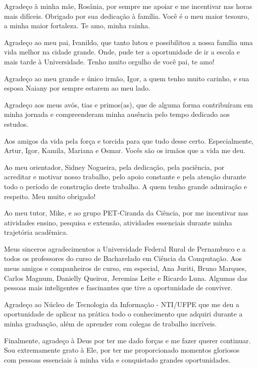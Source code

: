 \begin{agradecimentos}
Agradeço à minha mãe, Rosânia, por sempre me apoiar e me incentivar nas horas mais difíceis. Obrigado por sua dedicação à família. Você é o meu maior tesouro, a minha maior fortaleza. Te amo, minha rainha.

Agradeço ao meu pai, Ivanildo, que tanto lutou e possibilitou a nossa família uma vida melhor na cidade grande. Onde, pude ter a oportunidade de ir a escola e mais tarde à Universidade. Tenho muito orgulho de você pai, te amo!

Agradeço ao meu grande e único irmão, Igor, a quem tenho muito carinho, e sua esposa Naiany por sempre estarem ao meu lado.

Agradeço aos meus avós, tias e primos(as), que de alguma forma contribuíram em minha jornada e compreenderam minha ausência pelo tempo dedicado aos estudos.

Aos amigos da vida pela força e torcida para que tudo desse certo. Especialmente, Artur, Igor, Kamila, Mariana e Osmar. Vocês são os irmãos que a vida me deu.

Ao meu orientador, Sidney Nogueira, pela dedicação, pela paciência, por acreditar e motivar nosso trabalho, pelo apoio constante e pela atenção durante todo o período de construção deste trabalho. A quem tenho grande admiração e respeito. Meu muito obrigado!

Ao meu tutor, Mike, e ao grupo PET-Ciranda da Ciência, por me incentivar nas atividades ensino, pesquisa e extensão, atividades essenciais durante minha trajetória acadêmica.

Meus sinceros agradecimentos a Universidade Federal Rural de Pernambuco e a todos os professores do curso de Bacharelado em Ciência da Computação. Aos meus amigos e companheiros de curso, em especial, Ana Juriti, Bruno Marques, Carlos Magnum, Danielly Queiroz, Jeremias Leite e Ricardo Luna. Algumas das pessoas mais inteligentes e fascinantes que tive a oportunidade de conviver.

Agradeço ao Núcleo de Tecnologia da Informação - NTI/UFPE que me deu a oportunidade de aplicar na prática todo o conhecimento que adquiri durante a minha graduação, além de aprender com colegas de trabalho incríveis.

Finalmente, agradeço à Deus por ter me dado forças e me fazer querer continuar. Sou extremamente grato à Ele, por ter me proporcionado momentos gloriosos com pessoas essenciais à minha vida e conquistado grandes oportunidades.


\end{agradecimentos}

